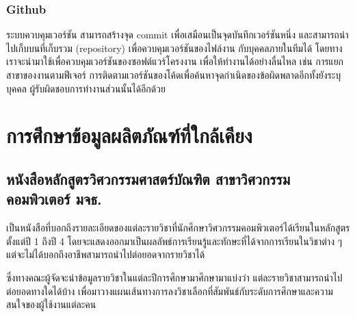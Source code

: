 \subsubsection{Github}
ระบบควบคุมเวอร์ชัน สามารถสร้างจุด commit เพื่อเสมือนเป็นจุดบันทึกเวอร์ชันหนึ่ง 
และสามารถนำไปเก็บบนที่เก็บรวม (repository) เพื่อควบคุมเวอร์ชันของไฟล์งาน
กับบุคคลภายในทีมได้ โดยทางเราจะนำมาใช้เพื่อควบคุมเวอร์ชันของซอฟต์แวร์โครงงาน 
เพื่อให้ทำงานได้อย่างลื่นไหล เช่น การแยกสาขาของงานตามฟีเจอร์ 
การติดตามเวอร์ชันของโค้ดเพื่อค้นหาจุดกำเนิดของข้อผิดพลาดอีกทั้งยังระบุบุคคล
ผู้รับผิดชอบการทำงานส่วนนั้นได้อีกด้วย
\section{การศึกษาข้อมูลผลิตภัณฑ์ที่ใกล้เคียง}
\subsection{หนังสือหลักสูตรวิศวกรรมศาสตร์บัณฑิต สาขาวิศวกรรมคอมพิวเตอร์ มจธ.}
เป็นหนังสือที่บอกถึงรายละเอียดของแต่ละรายวิชาที่นักศึกษาวิศวกรรมคอมพิวเตอร์ได้เรียนในหลักสูตรตั้งแต่ปี 1 ถึงปี 4
โดยจะแสดงออกมาเป็นผลลัพธ์การเรียนรู้และทักษะที่ได้จากการเรียนในวิชาต่าง ๆ แต่จะไม่ได้บอกถึงอาชีพสามารถนำไปต่อยอดจากรายวิชาได้
\par ซึ่งทางคณะผู้จัดจะนำข้อมูลรายวิชาในแต่ละปีการศึกษามาศึกษามาแบ่งว่า แต่ละรายวิชาสามารถนำไปต่อยอดทางใดได้บ้าง 
เพื่อมาวางแผนเส้นทางการลงวิชาเลือกที่สัมพันธ์กับระดับการศึกษาและความสนใจของผู้ใช้งานแต่ละคน

